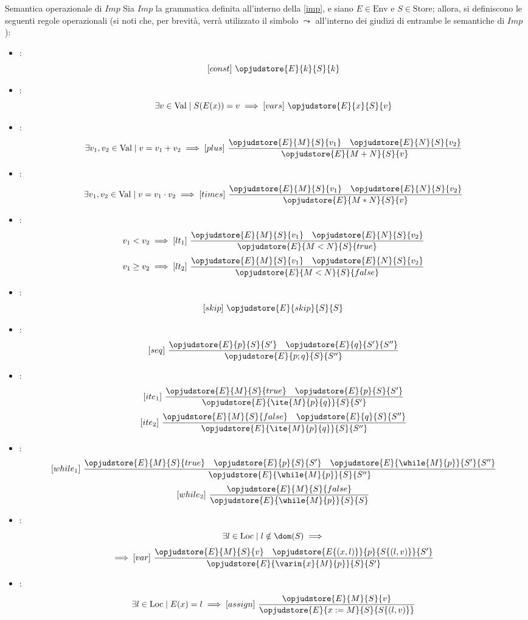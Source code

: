 \documentclass[a4paper, 12pt]{report}
\begin{document}
    \begin{framedprop}[label={imp sem},breakable]{Semantica operazionale di $Imp$}
        Sia $Imp$ la grammatica definita all'interno della \cref{imp}, e siano $E \in \mathrm{Env}$ e $S \in \mathrm{Store}$; allora, si definiscono le seguenti regole operazionali (si noti che, per brevità, verrà utilizzato il simbolo $\leadsto$ all'interno dei giudizi di entrambe le semantiche di $Imp$):

        \begin{itemize}
            \item {}: $$[const] \ \opjudstore{E}{k}{S}{k}$$
            \item {}: $$\exists v \in \mathrm{Val} \mid S(E(x)) = v \implies [vars] \ \opjudstore{E}{x}{S}{v}$$
            \item {}: $$\exists v_1, v_2 \in \mathrm{Val} \mid v = v_1 + v_2 \implies [plus] \ \dfrac{\opjudstore{E}{M}{S}{v_1} \quad \opjudstore{E}{N}{S}{v_2}}{\opjudstore{E}{M + N}{S}{v}}$$
            \item {}: $$\exists v_1, v_2 \in \mathrm{Val} \mid v = v_1 \cdot v_2 \implies [times] \ \dfrac{\opjudstore{E}{M}{S}{v_1} \quad \opjudstore{E}{N}{S}{v_2}}{\opjudstore{E}{M * N}{S}{v}}$$
            \item {}: $$v_1 < v_2 \implies [lt_1] \ \dfrac{\opjudstore{E}{M}{S}{v_1} \quad \opjudstore{E}{N}{S}{v_2}}{\opjudstore{E}{M  < N}{S}{true}}$$ $$v_1 \ge v_2 \implies [lt_2] \ \dfrac{\opjudstore{E}{M}{S}{v_1} \quad \opjudstore{E}{N}{S}{v_2}}{\opjudstore{E}{M  <  N}{S}{false}}$$
            \item {}: $$[skip] \ \opjudstore{E}{skip}{S}{S}$$
            \item {}: $$[seq] \ \dfrac{\opjudstore{E}{p}{ S}{S'} \quad \opjudstore{E}{q}{ S'}{S''}}{\opjudstore{E}{p;q}{S}{S''}}$$
            \item {}: $$[ite_1] \ \dfrac{\opjudstore{E}{M}{ S}{true} \quad \opjudstore{E}{p}{S}{S'}}{\opjudstore{E}{\ite{M}{p}{q}}{S}{S'}}$$ $$[ite_2] \ \dfrac{\opjudstore{E}{M}{S}{false} \quad \opjudstore{E}{q}{S}{S''}}{\opjudstore{E}{\ite{M}{p}{q}}{S}{S''}}$$
            \item {}: $$[while_1] \ \dfrac{\opjudstore{E}{M}{S}{true} \quad \opjudstore{E}{p}{S}{S'} \quad \opjudstore{E}{\while{M}{p}}{ S'}{S''}}{\opjudstore{E}{\while{M}{p}}{ S}{S''}}$$ $$[while_2] \ \dfrac{\opjudstore{E}{M}{S}{false}}{\opjudstore{E}{\while{M}{p}}{S}{S}}$$
            \item {}: $$\exists l \in \mathrm{Loc} \mid l \notin \dom(S) \implies$$ $$\implies [var] \ \dfrac{\opjudstore{E}{M}{S}{v} \quad \opjudstore{E\{(x,l)\}}{p}{S\{(l,v)\}}{S'}}{\opjudstore{E}{\varin{x}{M}{p}}{S}{S'}}$$
            \item {}: $$\exists l \in \mathrm{Loc} \mid E(x) = l \implies [assign] \ \dfrac{\opjudstore{E}{M}{S}{v}}{\opjudstore{E}{x := M}{ S}{S\{(l, v)\}}}$$
        \end{itemize}
    \end{framedprop}
\end{document}
